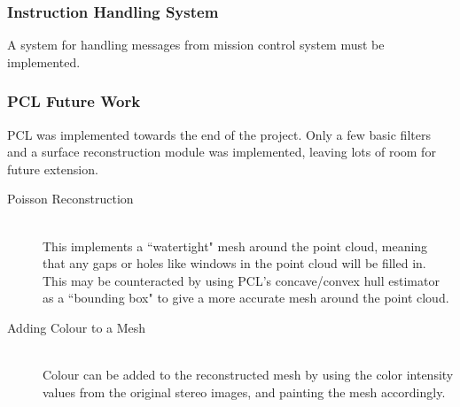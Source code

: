 \subsubsection{Instruction Handling System}
A system for handling messages from mission control system must be implemented.

\subsubsection{PCL Future Work}
PCL was implemented towards the end of the project. Only a few basic filters and a surface reconstruction module was implemented, leaving lots of room for future extension.
\begin{description}
\item[Poisson Reconstruction]\hfill \\
This implements a ``watertight" mesh around the point cloud, meaning that any gaps or holes like windows in the point cloud will be filled in. This may be counteracted by using PCL's concave/convex hull estimator as a ``bounding box" to give a more accurate mesh around the point cloud.
\item[Adding Colour to a Mesh]\hfill \\
Colour can be added to the reconstructed mesh by using the color intensity values from the original stereo images, and painting the mesh accordingly.
\end{description}



